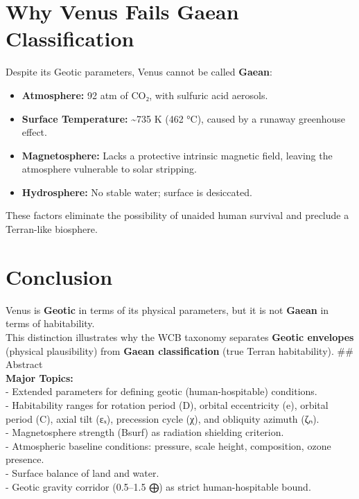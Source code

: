 \documentclass[
  letterpaper,
]{book}
\providecommand{\tightlist}{%
  \setlength{\itemsep}{0pt}\setlength{\parskip}{0pt}}
\begin{document}
\section{Why Venus Fails Gaean
Classification}\label{why-venus-fails-gaean-classification}

Despite its Geotic parameters, Venus cannot be called \textbf{Gaean}:

\begin{itemize}
\tightlist
\item
  \textbf{Atmosphere:} 92 atm of CO₂, with sulfuric acid aerosols.\\
\item
  \textbf{Surface Temperature:} \textasciitilde735 K (462 °C), caused by
  a runaway greenhouse effect.\\
\item
  \textbf{Magnetosphere:} Lacks a protective intrinsic magnetic field,
  leaving the atmosphere vulnerable to solar stripping.\\
\item
  \textbf{Hydrosphere:} No stable water; surface is desiccated.
\end{itemize}

These factors eliminate the possibility of unaided human survival and
preclude a Terran-like biosphere.

\section{Conclusion}\label{conclusion}

Venus is \textbf{Geotic} in terms of its physical parameters, but it is
not \textbf{Gaean} in terms of habitability.\\
This distinction illustrates why the WCB taxonomy separates
\textbf{Geotic envelopes} (physical plausibility) from \textbf{Gaean
classification} (true Terran habitability). \#\# Abstract\\
\textbf{Major Topics:}\\
- Extended parameters for defining geotic (human-hospitable)
conditions.\\
- Habitability ranges for rotation period (D), orbital eccentricity (e),
orbital period (C), axial tilt (εₓ), precession cycle (χ), and obliquity
azimuth (ζₙ).\\
- Magnetosphere strength (Bsurf) as radiation shielding criterion.\\
- Atmospheric baseline conditions: pressure, scale height, composition,
ozone presence.\\
- Surface balance of land and water.\\
- Geotic gravity corridor (0.5--1.5 ⨁) as strict human-hospitable bound.
\end{document}
